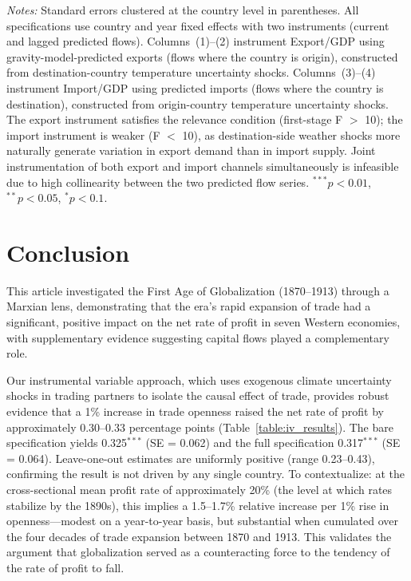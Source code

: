 \documentclass[10pt]{article}
\begin{document}
\begin{table}[!htbp]
\begin{minipage}{\textwidth}
  \textit{Notes:} Standard errors clustered at the country level in parentheses. All specifications use country and year fixed effects with two instruments (current and lagged predicted flows). Columns~(1)--(2) instrument Export/GDP using gravity-model-predicted exports (flows where the country is origin), constructed from destination-country temperature uncertainty shocks. Columns~(3)--(4) instrument Import/GDP using predicted imports (flows where the country is destination), constructed from origin-country temperature uncertainty shocks. The export instrument satisfies the relevance condition (first-stage F $>$ 10); the import instrument is weaker (F $<$ 10), as destination-side weather shocks more naturally generate variation in export demand than in import supply. Joint instrumentation of both export and import channels simultaneously is infeasible due to high collinearity between the two predicted flow series. $^{***}p<0.01$, $^{**}p<0.05$, $^{*}p<0.1$.
  \end{minipage}
\end{table}

\section{Conclusion}
\label{sec:conclusion}

This article investigated the First Age of Globalization (1870--1913) through a Marxian lens, demonstrating that the era's rapid expansion of trade had a significant, positive impact on the net rate of profit in seven Western economies, with supplementary evidence suggesting capital flows played a complementary role.

\par Our instrumental variable approach, which uses exogenous climate uncertainty shocks in trading partners to isolate the causal effect of trade, provides robust evidence that a 1\% increase in trade openness raised the net rate of profit by approximately 0.30--0.33 percentage points (Table~\ref{table:iv_results}). The bare specification yields 0.325$^{***}$ (SE = 0.062) and the full specification 0.317$^{***}$ (SE = 0.064). Leave-one-out estimates are uniformly positive (range 0.23--0.43), confirming the result is not driven by any single country. To contextualize: at the cross-sectional mean profit rate of approximately 20\% (the level at which rates stabilize by the 1890s), this implies a 1.5--1.7\% relative increase per 1\% rise in openness---modest on a year-to-year basis, but substantial when cumulated over the four decades of trade expansion between 1870 and 1913. This validates the argument that globalization served as a counteracting force to the tendency of the rate of profit to fall.
\end{document}
